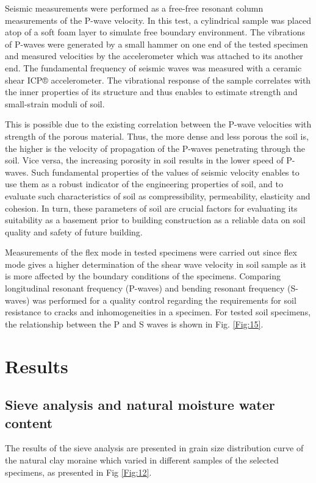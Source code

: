 \documentclass[USenglish,twocolumn]{article}
\begin{document}
Seismic measurements were performed as a free-free resonant column measurements of the P-wave velocity. In this test, a cylindrical sample was placed atop of a soft foam layer to simulate free boundary environment. The vibrations of P-waves were generated by a small hammer on one end of the tested specimen and measured velocities by the accelerometer which was attached to its another end. The fundamental frequency of seismic waves was measured with a ceramic shear ICP® accelerometer. The vibrational response of the sample correlates with the inner properties of its structure and thus enables to estimate strength and small-strain moduli of soil. 

This is possible due to the existing correlation between the P-wave velocities with strength of the porous material. Thus, the more dense and less porous the soil is, the higher is the velocity of propagation of the P-waves penetrating through the soil. Vice versa, the increasing porosity in soil results in the lower speed of P-waves. Such fundamental properties of the values of seismic velocity enables to use them as a robust indicator of the engineering properties of soil, and to evaluate such characteristics of soil as compressibility, permeability, elasticity and cohesion. In turn, these parameters of soil are crucial factors for evaluating its suitability as a basement prior to building construction as a reliable data on soil quality and safety of future building.

Measurements of the flex mode in tested specimens were carried out since flex mode gives a higher determination of the shear wave velocity in soil sample as it is more affected by the boundary conditions of the specimens. Comparing longitudinal resonant frequency (P-waves) and bending resonant frequency (S-waves) was performed for a quality control regarding the requirements for soil resistance to cracks and inhomogeneities in a specimen. For tested soil specimens, the relationship between the P and S waves is shown in Fig. \ref{Fig:15}.

\section{Results}\label{sec:5}

\subsection{Sieve analysis and natural moisture water content}

The results of the sieve analysis are presented in grain size distribution curve of the natural clay moraine which varied in different samples of the selected specimens, as presented in Fig \ref{Fig:12}.
\end{document}
